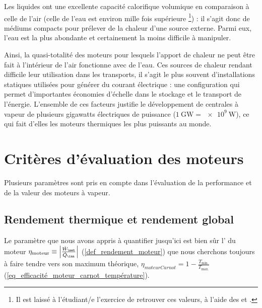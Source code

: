 	Les liquides ont une excellente capacité calorifique volumique en comparaison à celle de l’air (celle de l’eau est environ mille fois supérieure%
		\footnote{Il est laissé à l’étudiant/e l’exercice de retrouver ces valeurs, à l’aide des \coursquatre et \courscinq.}) : il s’agit donc de médiums compacts pour prélever de la chaleur d’une source externe. Parmi eux, l’eau est la plus abondante et certainement la moins difficile à manipuler.

	Ainsi, la quasi-totalité des moteurs pour lesquels l’apport de chaleur ne peut être fait à l’intérieur de l’air fonctionne avec de l’eau. Ces sources de chaleur rendant difficile leur utilisation dans les transports, il s’agit le plus souvent d’installations statiques utilisées pour générer du courant électrique : une configuration qui permet d’importantes économies d’échelle dans le stockage et le transport de l’énergie. L’ensemble de ces facteurs justifie le développement de centrales à vapeur de plusieurs \si{gigawatts} électriques de puissance ($\SI{1}{\giga\watt} = \SI{e9}{\watt}$), ce qui fait d’elles les moteurs thermiques les plus puissants au monde.

\onlyframabook{\clearpage}
\section{Critères d’évaluation des moteurs}
\label{ch_evaluation_moteurs_vapeur}

	Plusieurs paramètres sont pris en compte dans l’évaluation de la performance et de la valeur des moteurs à vapeur.

	\subsection{Rendement thermique et rendement global}

		Le paramètre que nous avons appris à quantifier jusqu’ici est bien sûr l’ du moteur $\eta_\text{moteur} \equiv \left| \frac{\dot{W}_\net}{\dot{Q}_\inn} \right|$ (\ref{def_rendement_moteur}) que nous cherchons toujours à faire tendre vers son maximum théorique, $\eta _{moteur Carnot} = 1 - \frac{T_\text{min.}}{T_\text{max.}}$ (\ref{eq_efficacité_moteur_carnot_température}).
		
